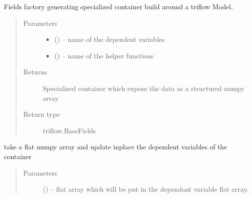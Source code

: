 \documentclass[letterpaper,10pt,english]{sphinxmanual}
\begin{document}
\begin{fulllineitems}
\begin{fulllineitems}
\label{\detokenize{triflow.core:triflow.core.fields.BaseFields.factory}}
Fields factory generating specialized container build around a
triflow Model.
\begin{quote}\begin{description}
\item[{Parameters}] \leavevmode\begin{itemize}
\item {} 
 () -- name of the dependent variables

\item {} 
 () -- name of the helper functions

\end{itemize}

\item[{Returns}] \leavevmode
Specialized container which expose the data as a structured numpy array

\item[{Return type}] \leavevmode
triflow.BaseFields

\end{description}\end{quote}

\end{fulllineitems}


\begin{fulllineitems}
\label{\detokenize{triflow.core:triflow.core.fields.BaseFields.fill}}
take a flat numpy array and update inplace the dependent
variables of the container
\begin{quote}\begin{description}
\item[{Parameters}] \leavevmode
{} () -- flat array which will be put in the dependant variable flat array.

\end{description}\end{quote}


\end{fulllineitems}
\end{fulllineitems}
\end{document}

